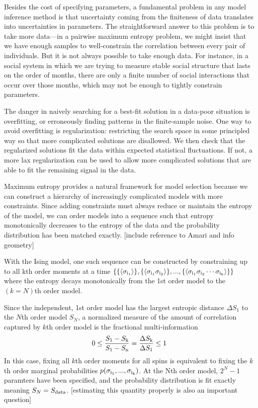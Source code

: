 \documentclass[aps,prl,twocolumn]{revtex4-1}
\begin{document}
Besides the cost of specifying parameters,
a fundamental problem in any model inference method is that uncertainty coming
from the finiteness of data translates into uncertainties in parameters.
The straightforward answer to this problem is to take more data---in a pairwise
maximum entropy problem, we might insist that we have enough samples to well-constrain
the correlation between every pair of individuals.  But it is not always possible
to take enough data.  For instance, in a social system in which we are trying to
measure stable social structure that lasts on the order of months, there are only
a finite number of social interactions that occur over those months, which may
not be enough to tightly constrain parameters.

The danger in naively searching for a best-fit solution in a data-poor situation
is overfitting, or erroneously finding patterns in the finite-sample noise.
One way to avoid overfitting is regularization:
restricting the search space in some principled way so that more complicated
solutions are disallowed.  We then check that the regularized solutions fit the
data within expected statistical fluctuations.  If not, a more lax regularization
can be used to allow more complicated solutions that are able to fit the
remaining signal in the data.

Maximum entropy provides a natural framework for model selection because we can construct a hierarchy of increasingly complicated models with more constraints. Since adding constraints must always reduce or maintain the entropy of the model, we can order models into a sequence such that entropy monotonically decreases to the entropy of the data and the probability distribution has been matched exactly. [include reference to Amari and info geometry]

With the Ising model, one such sequence can be constructed by constraining up to all kth order moments at a time $\left\{ \{\left<\sigma_{\rm i_1}\right>\},\{\left<\sigma_{\rm i_1}\sigma_{\rm i_2}\right>\},...,\{\left<\sigma_{\rm i_1}\sigma_{\rm i_2}\cdots\sigma_{\rm i_k}\right>\}\right\}$ where the entropy decays monotonically from the 1st order model to the $(k=N)$th order model. 

Since the independent, 1st order model has the largest entropic distance $\Delta S_1$ to the $N$th order model $S_N$, a normalized measure of the amount of correlation captured by $k$th order model is the fractional multi-information
\begin{align}
	0\leq \frac{S_1 - S_{\rm k}}{S_{\rm 1}-S_{\rm n}} = \frac{\Delta S_{\rm k}}{\Delta S_{\rm 1}} \leq 1
\end{align}
In this case, fixing all $k$th order moments for all spins is equivalent to fixing the $k$th order marginal probabilities $p(\sigma_{\rm i_1},...,\sigma_{\rm i_k})$. At the Nth order model, $2^N-1$ paramters have been specified, and the probability distribution is fit exactly meaning $S_N = S_{\rm data}$. [estimating this quantity properly is also an important question]
\end{document}
